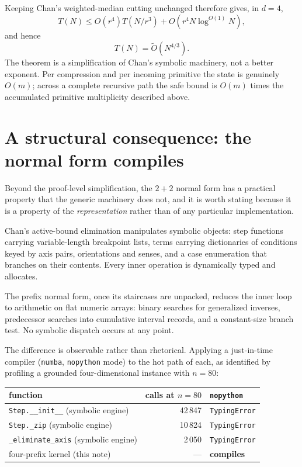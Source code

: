 \documentclass[12pt,a4paper]{article}
\theoremstyle{definition}
\newcommand{\1}{\mathbf 1}
\begin{document}
Keeping Chan's weighted-median cutting unchanged therefore gives, in $d=4$,
\begin{equation}
T(N)\le O(r^4)T(N/r^3)+O(r^4N\log^{O(1)}N),                   \label{eq:newrec}
\end{equation}
and hence
\begin{equation}
\boxed{T(N)=\widetilde O(N^{4/3}).}                            \label{eq:newtime}
\end{equation}
The theorem is a simplification of Chan's symbolic machinery, not a better exponent.  Per compression and per incoming primitive the state is genuinely $O(m)$; across a complete recursive path the safe bound is $O(m)$ times the accumulated primitive multiplicity described above.

\section{A structural consequence: the normal form compiles}
\label{sec:compiles}

Beyond the proof-level simplification, the $2+2$ normal form has a practical
property that the generic machinery does not, and it is worth stating because it
is a property of the \emph{representation} rather than of any particular
implementation.

Chan's active-bound elimination manipulates symbolic objects: step functions
carrying variable-length breakpoint lists, terms carrying dictionaries of
conditions keyed by axis pairs, orientations and senses, and a case enumeration
that branches on their contents. Every inner operation is dynamically typed and
allocates.

The prefix normal form, once its staircases are unpacked, reduces the inner loop
to arithmetic on flat numeric arrays: binary searches for generalized inverses,
predecessor searches into cumulative interval records, and a constant-size
branch test. No symbolic dispatch occurs at any point.

The difference is observable rather than rhetorical. Applying a just-in-time
compiler (\texttt{numba}, \texttt{nopython} mode) to the hot path of each, as
identified by profiling a grounded four-dimensional instance with $n=80$:

\begin{center}
\begin{tabular}{lrl}
\toprule
function & calls at $n=80$ & \texttt{nopython} \\
\midrule
\texttt{Step.\_\_init\_\_} (symbolic engine) & 42\,847 & \texttt{TypingError} \\
\texttt{Step.\_zip} (symbolic engine)        & 10\,824 & \texttt{TypingError} \\
\texttt{\_eliminate\_axis} (symbolic engine) &  2\,050 & \texttt{TypingError} \\
four-prefix kernel (this note)               & ---     & \textbf{compiles} \\
\bottomrule
\end{tabular}
\end{center}
\end{document}
